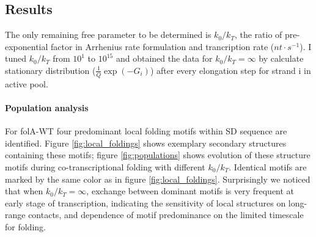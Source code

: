 \documentclass[11pt, a4paper]{article}
\begin{document}
\subsection{Results}

The only remaining free parameter to be determined is $k_0/k_T$, the ratio of pre-exponential factor in Arrhenius rate formulation and trancription rate ($nt\cdot s^{-1}$). I tuned $k_0/k_T$ from $10^{1}$ to $10^{15}$ and obtained the data for $k_0/k_T=\infty$ by calculate stationary distribution ($\frac{1}{Q}\exp(-G_i)$) after every elongation step for strand i in active pool.
 
\paragraph{Population analysis} For folA-WT four predominant local folding motifs within SD sequence are identified. Figure \ref{fig:local_foldings} shows exemplary secondary structures containing these motifs; figure \ref{fig:populations} shows evolution of these structure motifs during co-transcriptional folding with different $k_0/k_T$. Identical motifs are marked by the same color as in figure \ref{fig:local_foldings}. Surprisingly we noticed that when $k_0/k_T=\infty$, exchange between dominant motifs is very frequent at early stage of transcription, indicating the sensitivity of local structures on long-range contacts, and dependence of motif predominance on the limited timescale for folding.
\end{document}
